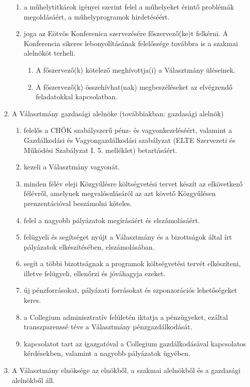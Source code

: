 \documentclass{../styles/rulebook}
\begin{document}
\begin{enumerate}
\begin{enumerate}
        \item a műhelytitkárok igényei szerint felel a műhelyeket érintő problémák megoldásáért, a műhelyprogramok hirdetéséért.
        \item joga az Eötvös Konferenica szervezésére főszervező(ke)t felkérni. A Konferencia sikeres lebonyolításának felelőssége továbbra is a szakmai alelnököt terheli.
		\begin{enumerate}
            \item A főszervező(k) kötelező meghívottja(i) a Választmány üléseinek.
            \item A főszervező(k) összehívhat(nak) megbeszéléseket az elvégzendő feladatokkal kapcsolatban.
		\end{enumerate}
	\end{enumerate}
	\item A Választmány gazdasági alelnöke (továbbiakban: gazdasági alelnök)
	\begin{enumerate}
		\item felelős a CHÖK szabályszerű pénz- és vagyonkezeléséért, valamint a Gazdálkodási és Vagyongazdálkodási szabályzat (ELTE Szervezeti és Működési Szabályzat I. 5. melléklet) betartásáért.
		\item kezeli a Választmány vagyonát.
		\item minden félév eleji Közgyűlésre költségvetési tervet készít az elkövetkező félévről, amelynek megvalósulásáról az azt követő Közgyűlésen prenzentációval beszámolni köteles.
		\item felel a nagyobb pályázatok megírásáért és elszámolásáért.
		\item felügyeli és segítséget nyújt a Választmány és a bizottságok által írt pályázatok elkészítésében, elszámolásában.
		\item segít a többi bizottságnak a programok költségvetési tervét elkészíteni, illetve felügyeli, ellenőrzi és jóváhagyja ezeket.
		\item új pénzforrásokat, pályázati forrásokat és szponzorációs lehetőségeket keres.
		\item a Collegium adminisztratív felületén iktatja a pénzügyeket, ezáltal transzparenssé téve a Választmány pénzgazdálkodását.
		\item kapcsolatot tart az igazgatóval a Collegium gazdálkodásával kapcsolatos kérdésekben, valamint a nagyobb pályázatok ügyében.
	\end{enumerate}
	\item A Választmány elnöksége az elnökből, a szakmai alelnökből és a gazdasági alelnökből áll.

\end{enumerate}
\end{document}
